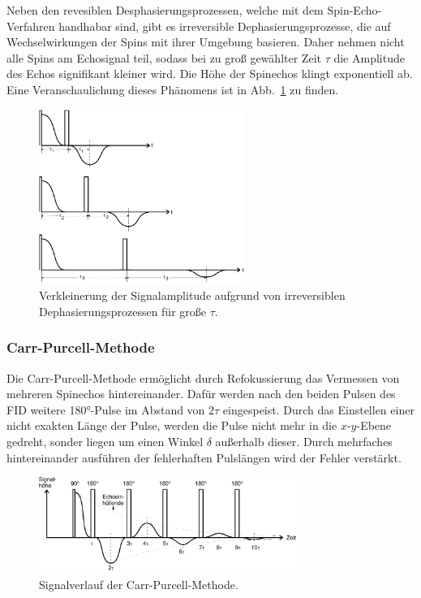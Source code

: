 Neben den revesiblen Desphasierungsprozessen, welche mit dem Spin-Echo-Verfahren
handhabar sind, gibt es irreversible Dephasierungsprozesse, die auf Wechselwirkungen
der Spins mit ihrer Umgebung basieren.
Daher nehmen nicht alle Spins am Echosignal teil, sodass bei zu groß gewählter Zeit $\tau$
die Amplitude des Echos signifikant kleiner wird.
Die Höhe der Spinechos klingt exponentiell ab.
Eine Veranschaulichung dieses Phänomens ist in Abb.~\ref{fig:dephase}
zu finden.
\begin{figure}[h]
  \centering
  \includegraphics[width = 0.6\textwidth]{Pics/echo.pdf}
  \caption{Verkleinerung der Signalamplitude aufgrund von irreversiblen Dephasierungsprozessen
  für große $\tau$\cite{anleitung}.}
  \label{fig:dephase}
\end{figure}

\subsubsection{Carr-Purcell-Methode}
\vspace{-10pt}
Die Carr-Purcell-Methode ermöglicht durch Refokussierung das Vermessen von mehreren Spinechos
hintereinander. Dafür werden nach den beiden Pulsen des FID weitere 180°-Pulse
im Abstand von $2\tau$ eingespeist. Durch das Einstellen einer nicht exakten Länge
der Pulse, werden die Pulse nicht mehr in die $x$-$y$-Ebene gedreht, sonder
liegen um einen Winkel $\delta$ außerhalb dieser.
Durch mehrfaches hintereinander ausführen der fehlerhaften Pulslängen wird
der Fehler verstärkt.
\begin{figure}
  \centering
  \includegraphics[width = 0.75\textwidth]{Pics/carr_purcell.pdf}
  \caption{Signalverlauf der Carr-Purcell-Methode\cite{anleitung}.}
  \label{eqn:carr_purcell}
\end{figure}
\vspace{-10pt}
